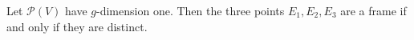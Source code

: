 Let $\mathcal{P}(V)$ have $g$-dimension one. Then the three points $E_1, E_2, E_3$ are a frame if and only if they are distinct.
